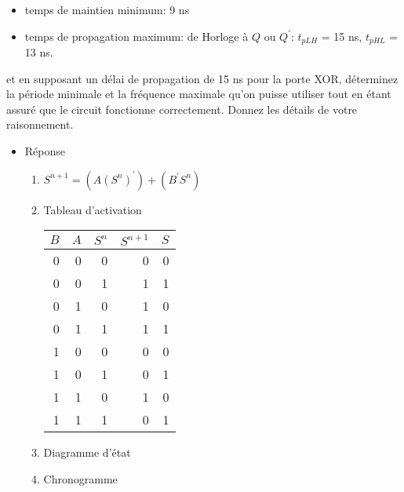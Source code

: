 \documentclass[letter, oneside]{book}
\begin{document}
\begin{itemize}
\begin{enumerate}
\begin{itemize}
\item temps de maintien minimum: 9 ns

\item temps de propagation maximum: de Horloge à \(Q\) ou
\(Q^{\prime}\): \(t_{pLH}\) = 15 ns, \(t_{pHL}\) = 13 ns.
\end{itemize}

et en supposant un délai de propagation de 15 ns pour la porte
XOR, déterminez la période minimale et la fréquence
maximale qu'on puisse utiliser tout en étant assuré que le circuit
fonctionne correctement. Donnez les détails de votre raisonnement.
\end{enumerate}

\begin{itemize}
\item Réponse
\label{sec:orgf2a371d}
\begin{enumerate}
\item \(S^{n+1} = (A(S^n)^{\prime})  + (B^{\prime} S^n)\)

\item Tableau d'activation
\begin{center}
\begin{tabular}{rrrrr}
\(B\) & \(A\) & \(S^n\) & \(S^{n+1}\) & \(S\)\\[0pt]
\hline
0 & 0 & 0 & 0 & 0\\[0pt]
0 & 0 & 1 & 1 & 1\\[0pt]
0 & 1 & 0 & 1 & 0\\[0pt]
0 & 1 & 1 & 1 & 1\\[0pt]
1 & 0 & 0 & 0 & 0\\[0pt]
1 & 0 & 1 & 0 & 1\\[0pt]
1 & 1 & 0 & 1 & 0\\[0pt]
1 & 1 & 1 & 0 & 1\\[0pt]
\end{tabular}
\end{center}

\item Diagramme d'état

\begin{center}

\end{center}

\item Chronogramme

\begin{center}

\end{center}


\end{enumerate}
\end{itemize}
\end{itemize}
\end{document}
